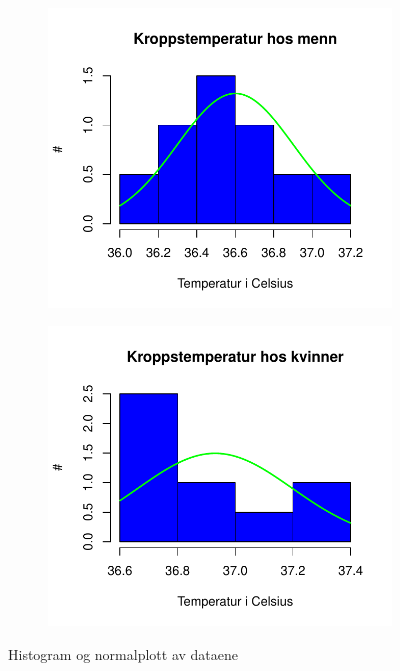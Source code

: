 \documentclass[12pt,
               a4paper,
               article,
               oneside,
               oldfontcommands,
               norsk]{memoir}
\begin{document}
\begin{figure}[H]
  \centering
  \begin{subfigure}{.5\textwidth}
    \centering
    \includegraphics[width=1\linewidth]{Kropps_temp_Menn.pdf}
  \end{subfigure}%
  \begin{subfigure}{.5\textwidth}
    \centering
    \includegraphics[width=1\linewidth]{Kropps_temp_Kvinner.pdf}
  \end{subfigure}
  \caption{Histogram og normalplott av dataene}
  \end{figure}
\end{document}
